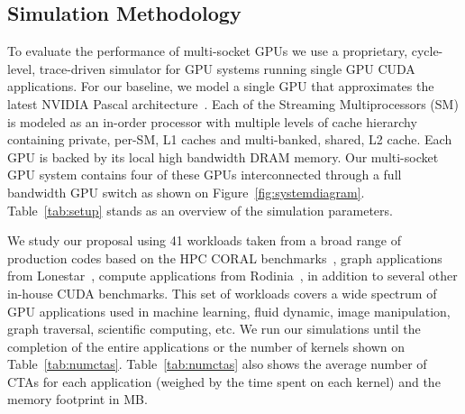 \subsection{Simulation Methodology}
\label{sec:methodology}

To evaluate the performance of multi-socket GPUs we use a proprietary, 
cycle-level, trace-driven simulator for GPU systems running single GPU CUDA 
applications. For our baseline, we model a single GPU that approximates the 
latest NVIDIA Pascal architecture~\cite{inside-pascal}. Each of the 
Streaming Multiprocessors (SM) is modeled as an in-order processor with 
multiple levels of cache hierarchy containing private, per-SM, L1 caches and 
multi-banked, shared, L2 cache. Each GPU is backed by its local high 
bandwidth DRAM memory. Our multi-socket GPU system contains four of these 
GPUs interconnected through a full bandwidth GPU switch as shown on 
Figure~\ref{fig:systemdiagram}. Table~\ref{tab:setup} stands as an overview 
of the simulation parameters.

We study our proposal using 41 workloads taken from a broad range of 
production codes based on the HPC CORAL benchmarks~\cite{coral}, graph 
applications from Lonestar~\cite{lonestar}, compute applications from 
Rodinia~\cite{Che2009}, in addition to several other in-house CUDA benchmarks. 
This set of workloads covers a wide spectrum of GPU applications used in machine 
learning, fluid dynamic, image manipulation, graph traversal, scientific 
computing, etc. We run our simulations until the completion of the entire 
applications or the number of kernels shown on Table~\ref{tab:numctas}.
Table~\ref{tab:numctas} also shows the average number of CTAs for each
application (weighed by the time spent on each kernel) and the memory 
footprint in MB.

